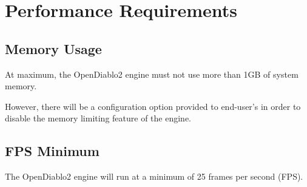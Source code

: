 \section{Performance Requirements} \label{sec:performancerequirements}


\subsection{Memory Usage}
At maximum, the OpenDiablo2 engine must not use more than 1GB of system memory.

However, there will be a configuration option provided to end-user's in order to disable the memory limiting feature of the engine.

\subsection{FPS Minimum}
The OpenDiablo2 engine will run at a minimum of 25 frames per second (FPS).
